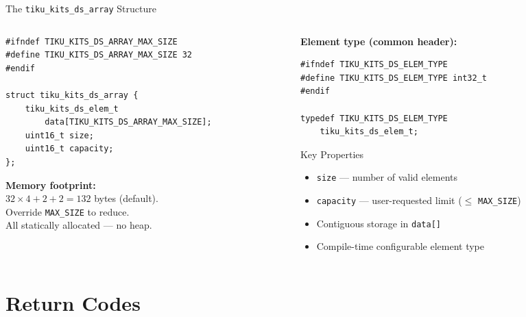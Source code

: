 \documentclass[aspectratio=169, 10pt]{beamer}
\begin{document}
\begin{frame}[fragile]{The \texttt{tiku\_kits\_ds\_array} Structure}
\begin{columns}[T]
\begin{column}{0.48\textwidth}
\begin{lstlisting}[style=cstyle,
  title={ds/array/tiku\_kits\_ds\_array.h}]
#ifndef TIKU_KITS_DS_ARRAY_MAX_SIZE
#define TIKU_KITS_DS_ARRAY_MAX_SIZE 32
#endif

struct tiku_kits_ds_array {
    tiku_kits_ds_elem_t
        data[TIKU_KITS_DS_ARRAY_MAX_SIZE];
    uint16_t size;
    uint16_t capacity;
};
\end{lstlisting}

\vspace{0.3em}
\textbf{Memory footprint:}\\
$32 \times 4 + 2 + 2 = 132$ bytes (default).\\
Override \texttt{MAX\_SIZE} to reduce.\\
All statically allocated --- no heap.
\end{column}

\begin{column}{0.48\textwidth}
\textbf{Element type (common header):}
\begin{lstlisting}[style=cstyle,
  title={ds/tiku\_kits\_ds.h}]
#ifndef TIKU_KITS_DS_ELEM_TYPE
#define TIKU_KITS_DS_ELEM_TYPE int32_t
#endif

typedef TIKU_KITS_DS_ELEM_TYPE
    tiku_kits_ds_elem_t;
\end{lstlisting}

\vspace{0.5em}
\begin{block}{Key Properties}
\begin{itemize}
  \item \texttt{size} --- number of valid elements
  \item \texttt{capacity} --- user-requested limit ($\leq$ \texttt{MAX\_SIZE})
  \item Contiguous storage in \texttt{data[]}
  \item Compile-time configurable element type
\end{itemize}
\end{block}
\end{column}
\end{columns}
\end{frame}

\section{Return Codes}
\end{document}

